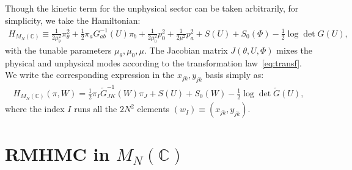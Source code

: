 \documentclass[12pt]{article}
\begin{document}
Though the kinetic term for the unphysical sector
can be taken arbitrarily,
for simplicity, we take the Hamiltonian:
\begin{align}
  H_{M_N(\mathbb{C})}
  \equiv
  \frac{1}{2 \mu_\theta^2}
  \pi_\theta^2
  +
  \frac{1}{2}
  \pi_a G^{-1}_{ab} (U) \pi_b
  +
  \frac{1}{2 \mu_0^2}
  p_0^2
  +
  \frac{1}{2 \mu^2}
  p_a^2
  +
  S(U)
  +
  S_0(\Phi)
  - \frac{1}{2} \log \det G(U),
\end{align}
with the tunable parameters $\mu_\theta, \mu_0, \mu$.
The Jacobian matrix $J(\theta, U, \Phi)$ mixes the
physical and unphysical modes according to
the transformation law~\eqref{eq:transf}.
We write the corresponding expression in the $x_{jk}, y_{jk}$
basis simply as:
\begin{align}
  H_{M_N(\mathbb{C})}
  (\pi, W)
  =
  \frac{1}{2} \pi_I \tilde{G}_{JK}^{-1}(W) \pi_J + S(U) + S_0(W)
  - \frac{1}{2} \log \det \tilde G(U),
  \label{eq:Hamil_GLN}
\end{align}
where the index $I$ runs all the $2N^2$ elements
$(w_I) \equiv ( x_{jk}, y_{jk} )$.


\section{RMHMC in $M_N(\mathbb{C})$}
\label{sec:rmhmc_gln}
\end{document}
